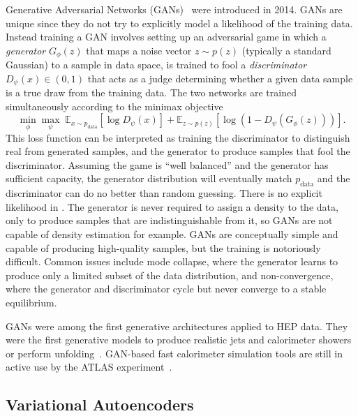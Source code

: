 Generative Adversarial Networks (GANs)~\cite{Goodfellow:2014gan} were introduced in 2014.
GANs are unique since they do not try to explicitly model a likelihood of the training data.
Instead training a GAN involves setting up an adversarial game in which a \textit{generator} $G_\phi(z)$ that maps a noise vector $z \sim p(z)$ (typically a standard Gaussian) to a sample in data space, is trained to fool a \textit{discriminator} $D_\psi(x) \in (0,1)$ that acts as a judge determining whether a given data sample is a true draw from the training data.
The two networks are trained simultaneously according to the minimax objective
\begin{equation}
    \min_\phi \max_\psi \; \mathbb{E}_{x \sim p_\text{data}}\!\left[\log D_\psi(x)\right]
    + \mathbb{E}_{z \sim p(z)}\!\left[\log\!\left(1 - D_\psi(G_\phi(z))\right)\right].
    \label{eqn:gan}
\end{equation}
This loss function can be interpreted as training the discriminator to distinguish real from generated samples, and the generator to produce samples that fool the discriminator.
Assuming the game is ``well balanced'' and the generator has sufficient capacity, the generator distribution will eventually match $p_\text{data}$ and the discriminator can do no better than random guessing.
There is no explicit likelihood in .
The generator is never required to assign a density to the data, only to produce samples that are indistinguishable from it, so GANs are not capable of density estimation for example.
GANs are conceptually simple and capable of producing high-quality samples, but the training is notoriously difficult.
Common issues include mode collapse, where the generator learns to produce only a limited subset of the data distribution, and non-convergence, where the generator and discriminator cycle but never converge to a stable equilibrium.

GANs were among the first generative architectures applied to HEP data.
They were the first generative models to produce realistic jets and calorimeter showers~\cite{Paganini:2017hrr,Paganini:2017dwg,deOliveira:2017pjk,Butter:2020qhk,Buhmann:2023pmh} or perform unfolding~\cite{Bellagente:2019uyp}. 
GAN-based fast calorimeter simulation tools are still in active use by the ATLAS experiment~\cite{ATLAS:2021pzo}.

\subsection{Variational Autoencoders}
\label{sec:vae}

